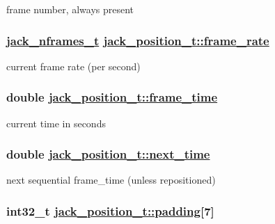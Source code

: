frame number, always present \hypertarget{structjack__position__t_74278f5e2398691cd7a0854aeeb3ae4c}{
\subsubsection[frame\_\-rate]{\setlength{\rightskip}{0pt plus 5cm}\hyperlink{types_8h_fe9972a13782c1e282747fdb4bc46f9c}{jack\_\-nframes\_\-t} \hyperlink{structjack__position__t_74278f5e2398691cd7a0854aeeb3ae4c}{jack\_\-position\_\-t::frame\_\-rate}}}
\label{structjack__position__t_74278f5e2398691cd7a0854aeeb3ae4c}


current frame rate (per second) \hypertarget{structjack__position__t_683f56a64ae2e6252300b510a6781423}{
\subsubsection[frame\_\-time]{\setlength{\rightskip}{0pt plus 5cm}double \hyperlink{structjack__position__t_683f56a64ae2e6252300b510a6781423}{jack\_\-position\_\-t::frame\_\-time}}}
\label{structjack__position__t_683f56a64ae2e6252300b510a6781423}


current time in seconds \hypertarget{structjack__position__t_5cf2de1a44101fdf59c134587f56520d}{
\subsubsection[next\_\-time]{\setlength{\rightskip}{0pt plus 5cm}double \hyperlink{structjack__position__t_5cf2de1a44101fdf59c134587f56520d}{jack\_\-position\_\-t::next\_\-time}}}
\label{structjack__position__t_5cf2de1a44101fdf59c134587f56520d}


next sequential frame\_\-time (unless repositioned) \hypertarget{structjack__position__t_f81dd503d4fca757b4140cdf57b530dc}{
\subsubsection[padding]{\setlength{\rightskip}{0pt plus 5cm}int32\_\-t \hyperlink{structjack__position__t_f81dd503d4fca757b4140cdf57b530dc}{jack\_\-position\_\-t::padding}\mbox{[}7\mbox{]}}}
\label{structjack__position__t_f81dd503d4fca757b4140cdf57b530dc}


